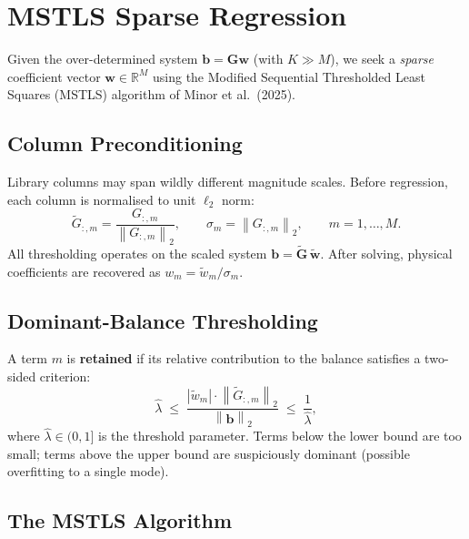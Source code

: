 \documentclass[11pt, letterpaper]{article}
\theoremstyle{definition}
\newcommand{\R}{\mathbb{R}}
\newcommand{\vw}{\mathbf{w}}
\newcommand{\vb}{\mathbf{b}}
\newcommand{\vG}{\mathbf{G}}
\newcommand{\norm}[1]{\left\lVert #1 \right\rVert}
\begin{document}
\section{MSTLS Sparse Regression}
\label{sec:mstls}

Given the over-determined system $\vb = \vG\vw$ (with $K \gg M$),
we seek a \emph{sparse} coefficient vector $\vw \in \R^{M}$ using the
Modified Sequential Thresholded Least Squares (MSTLS) algorithm of
Minor et al.\ (2025).

\subsection{Column Preconditioning}
\label{sec:precondition}

Library columns may span wildly different magnitude scales.  Before
regression, each column is normalised to unit $\ell_2$ norm:
\begin{equation}
\label{eq:precondition}
  \tilde{G}_{:,m} = \frac{G_{:,m}}{\norm{G_{:,m}}_2}, \qquad
  \sigma_m = \norm{G_{:,m}}_2, \qquad m = 1, \dots, M.
\end{equation}
All thresholding operates on the scaled system
$\vb = \tilde{\vG}\,\tilde{\vw}$.  After solving, physical
coefficients are recovered as $w_m = \tilde{w}_m / \sigma_m$.

\subsection{Dominant-Balance Thresholding}
\label{sec:threshold}

A term $m$ is \textbf{retained} if its relative contribution to the
balance satisfies a two-sided criterion:
\begin{equation}
\label{eq:dom-balance}
  \boxed{
  \hat{\lambda}
  \;\le\;
  \frac{|\tilde{w}_m| \cdot \norm{\tilde{G}_{:,m}}_2}{\norm{\vb}_2}
  \;\le\;
  \frac{1}{\hat{\lambda}},
  }
\end{equation}
where $\hat{\lambda} \in (0, 1]$ is the threshold parameter.  Terms
below the lower bound are too small; terms above the upper bound are
suspiciously dominant (possible overfitting to a single mode).

\subsection{The MSTLS Algorithm}
\label{sec:mstls-algo}
\end{document}
